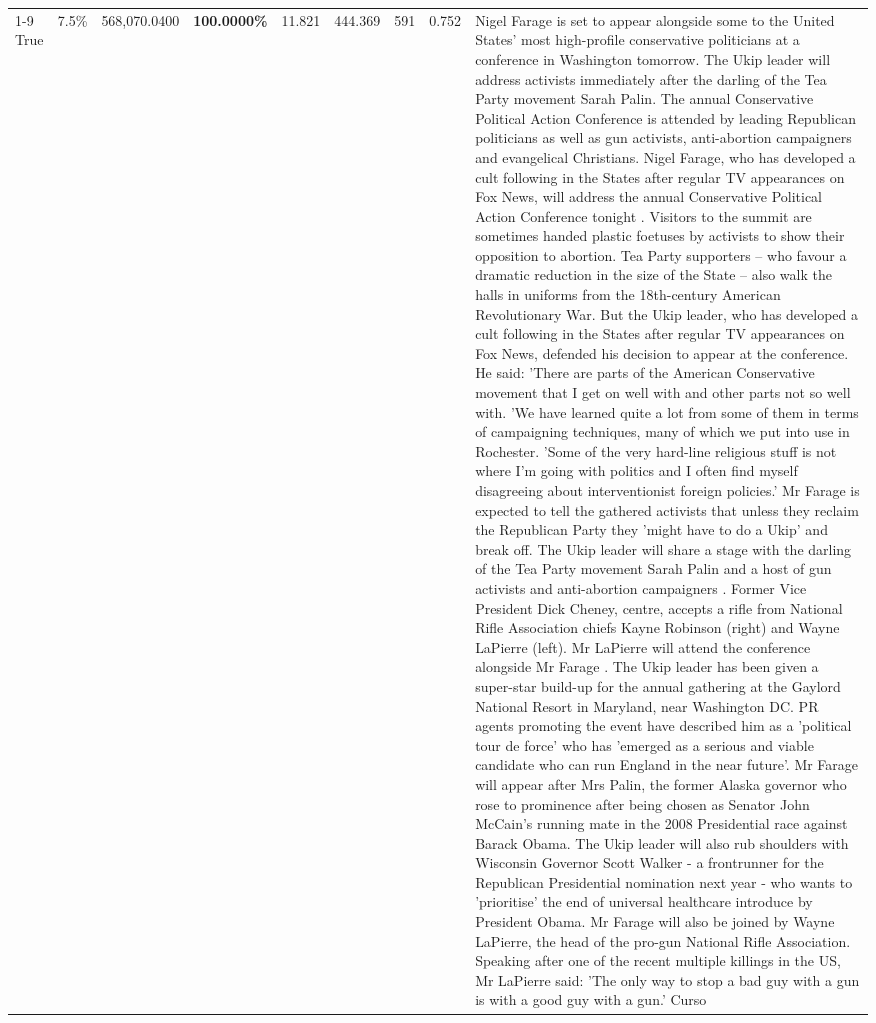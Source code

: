 \begin{table}[H]
\begin{tabular}{lllrlllll}
\cline{1-9}
True & 7.5\% & 568,070.0400 & \bfseries \color{red} 100.0000\% & 11.821 & 444.369 & 591 & 0.752 & Nigel Farage is set to appear alongside some to the United States' most high-profile conservative politicians at a conference in Washington tomorrow. The Ukip leader will address activists immediately after the darling of the Tea Party movement Sarah Palin. The annual Conservative Political Action Conference is attended by leading Republican politicians as well as gun activists, anti-abortion campaigners and evangelical Christians. Nigel Farage, who has developed a cult following in the States after regular TV appearances on Fox News, will address the annual Conservative Political Action Conference tonight . Visitors to the summit are sometimes handed plastic foetuses by activists to show their opposition to abortion. Tea Party supporters – who favour a dramatic reduction in the size of the State – also walk the halls in uniforms from the 18th-century American Revolutionary War. But the Ukip leader, who has developed a cult following in the States after regular TV appearances on Fox News, defended his decision to appear at the conference. He said: 'There are parts of the American Conservative movement that I get on well with and other parts not so well with. 'We have learned quite a lot from some of them in terms of campaigning techniques, many of which we put into use in Rochester. 'Some of the very hard-line religious stuff is not where I'm going with politics and I often find myself disagreeing about interventionist foreign policies.' Mr Farage is expected to tell the gathered activists that unless they reclaim the Republican Party they 'might have to do a Ukip' and break off. The Ukip leader will share a stage with the darling of the Tea Party movement Sarah Palin and a host of gun activists and anti-abortion campaigners . Former Vice President Dick Cheney, centre, accepts a rifle from National Rifle Association chiefs Kayne Robinson (right) and Wayne LaPierre (left). Mr LaPierre will attend the conference alongside Mr Farage . The Ukip leader has been given a super-star build-up for the annual gathering at the Gaylord National Resort in Maryland, near Washington DC. PR agents promoting the event have described him as a 'political tour de force' who has 'emerged as a serious and viable candidate who can run England in the near future'. Mr Farage will appear after Mrs Palin, the former Alaska governor who rose to prominence after being chosen as Senator John McCain's running mate in the 2008 Presidential race against Barack Obama. The Ukip leader will also rub shoulders with Wisconsin Governor Scott Walker - a frontrunner for the Republican Presidential nomination next year - who wants to 'prioritise' the end of universal healthcare introduce by President Obama. Mr Farage will also be joined by Wayne LaPierre, the head of the pro-gun National Rifle Association. Speaking after one of the recent multiple killings in the US, Mr LaPierre said: 'The only way to stop a bad guy with a gun is with a good guy with a gun.' Curso \\

\end{tabular}
\end{table}
